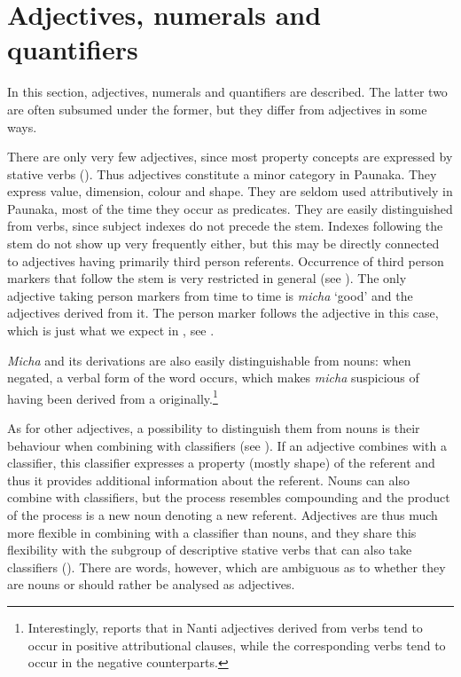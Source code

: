 
\section{Adjectives, numerals and quantifiers}\label{sec:AdjectivesNumerals}

In this section, adjectives, numerals and quantifiers are described. The latter two are often subsumed under the former, but they differ from adjectives in some ways. 

There are only very few adjectives, since most property concepts are expressed by stative verbs (). Thus adjectives constitute a minor category in Paunaka. They express value, dimension, colour and shape. They are seldom used attributively in Paunaka, most of the time they occur as predicates. They are easily distinguished from verbs, since subject indexes do not precede the stem. Indexes following the stem do not show up very frequently either, but this may be directly connected to adjectives having primarily third person referents. Occurrence of third person markers that follow the stem is very restricted in general (see ). The only adjective taking person markers from time to time is \textit{micha} ‘good’ and the adjectives derived from it. The person marker follows the adjective in this case, which is just what we expect in , see . 

\textit{Micha} and its derivations are also easily distinguishable from nouns: when negated, a verbal form of the word occurs, which makes \textit{micha} suspicious of having been derived from a  originally.\footnote{Interestingly, \citet[313]{Michael2008} reports that in Nanti adjectives derived from verbs tend to occur in positive attributional clauses, while the corresponding verbs tend to occur in the negative counterparts.} 

As for other adjectives, a possibility to distinguish them from nouns is their behaviour when combining with classifiers (see ). If an adjective combines with a classifier, this classifier expresses a property (mostly shape) of the referent and thus it provides additional information about the referent. Nouns can also combine with classifiers, but the process resembles compounding and the product of the process is a new noun denoting a new referent. Adjectives are thus much more flexible in combining with a classifier than nouns, and they share this flexibility with the subgroup of descriptive stative verbs that can also take classifiers (). There are words, however, which are ambiguous as to whether they are nouns or should rather be analysed as adjectives.

